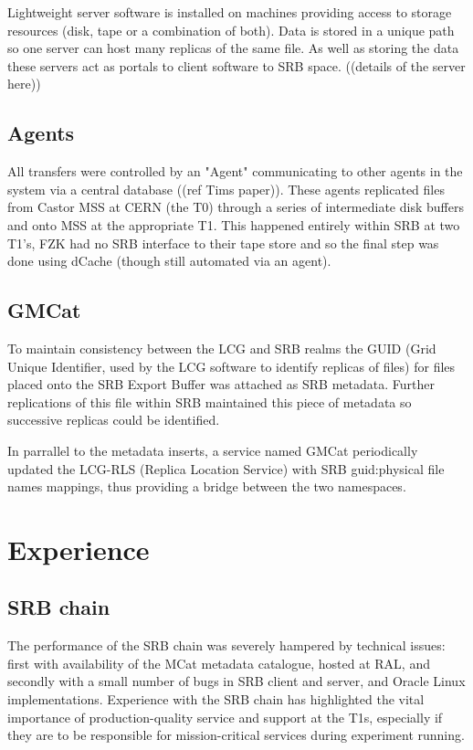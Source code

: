 \documentclass{cmspaper}
\begin{document}
Lightweight server software is installed on machines providing access to storage resources (disk, tape or 
a combination of both). Data is stored in a unique path so one server can host many replicas of the same file.
As well as storing the data these servers act as portals to client software to SRB space. ((details of the server here))

\subsection{Agents}
All transfers were controlled by an "Agent" communicating to other agents in the system via a central
database ((ref Tims paper)). These agents replicated files from Castor MSS at CERN (the T0) through a 
series of intermediate disk buffers and onto MSS at the appropriate T1. This happened entirely within 
SRB at two T1's, FZK had no SRB interface to their tape store and so the final step was done using dCache 
(though still automated via an agent).

\subsection{GMCat}
To maintain consistency between the LCG and SRB realms the GUID (Grid Unique Identifier, used 
by the LCG software to identify replicas of files) for files placed onto the SRB Export Buffer 
was attached as SRB metadata. Further replications of this file within SRB maintained this
piece of metadata so successive replicas could be identified.

In parrallel to the metadata inserts, a service named GMCat periodically updated the 
LCG-RLS (Replica Location Service) with SRB guid:physical file names mappings, thus 
providing a bridge between the two namespaces.

\section{Experience}

\subsection{SRB chain}
The performance of the SRB chain was severely hampered by technical
issues: first with availability of the MCat metadata catalogue, hosted
at RAL, and secondly with a small number of bugs in SRB client and
server, and Oracle Linux implementations. Experience with the SRB
chain has highlighted the vital importance of production-quality
service and support at the T1s, especially if they are to be
responsible for mission-critical services during experiment running.
\end{document}

